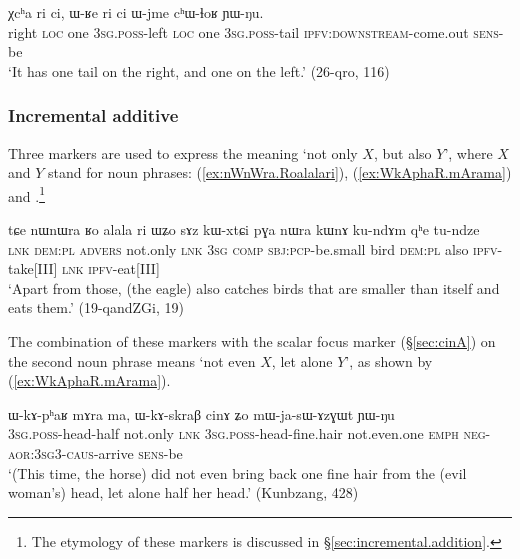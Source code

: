  \begin{exe}
\ex \label{ex:Xcha.ri.ci}
\gll   χcʰa ri ci, ɯ-ʁe ri ci ɯ-jme cʰɯ-ɬoʁ ɲɯ-ŋu. \\
right \textsc{loc} one  \textsc{3sg}.\textsc{poss}-left \textsc{loc} one \textsc{3sg}.\textsc{poss}-tail \textsc{ipfv}:\textsc{downstream}-come.out \textsc{sens}-be \\
\glt `It has one tail on the right, and one on the left.' (26-qro, 116)
\end{exe}

 
    
 \subsubsection{Incremental additive} \label{sec:incremental.add.np} 
Three markers are used to express the meaning `not only $X$, but also $Y$', where $X$ and $Y$ stand for noun phrases:  (\ref{ex:nWnWra.Roalalari}),  (\ref{ex:WkAphaR.mArama}) and .\footnote{The etymology of these markers is discussed in §\ref{sec:incremental.addition}. } 

 \begin{exe}
\ex \label{ex:nWnWra.Roalalari}
 \gll tɕe nɯnɯra ʁo alala ri ɯʑo sɤz kɯ-xtɕi pɣa nɯra kɯnɤ ku-ndɤm qʰe tu-ndze \\
 \textsc{lnk} \textsc{dem}:\textsc{pl} \textsc{advers} not.only \textsc{lnk} \textsc{3sg} \textsc{comp} \textsc{sbj}:\textsc{pcp}-be.small bird \textsc{dem}:\textsc{pl} also \textsc{ipfv}-take[III] \textsc{lnk} \textsc{ipfv}-eat[III] \\
 \glt `Apart from those, (the eagle) also catches birds that are smaller than itself and eats them.' (19-qandZGi, 19)
  \end{exe}

The combination of these markers with the scalar focus marker  (§\ref{sec:cinA}) on the second noun phrase means `not even $X$, let alone $Y$', as shown by (\ref{ex:WkAphaR.mArama}).


 \begin{exe}
\ex \label{ex:WkAphaR.mArama}
 \gll ɯ-kɤ-pʰaʁ mɤra ma, ɯ-kɤ-skraβ cinɤ ʑo mɯ-ja-sɯ-ɤzɣɯt ɲɯ-ŋu \\
 \textsc{3sg}.\textsc{poss}-head-half not.only \textsc{lnk} \textsc{3sg}.\textsc{poss}-head-fine.hair not.even.one \textsc{emph} \textsc{neg}-\textsc{aor}:\textsc{3sg}\fl{}3-\textsc{caus}-arrive \textsc{sens}-be \\
 \glt `(This time, the horse) did not even bring back one fine hair from the (evil woman's) head, let alone half her head.' (Kunbzang, 428)
  \end{exe} 
  
